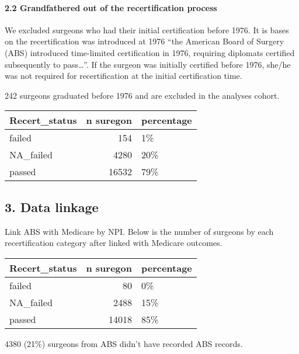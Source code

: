 \documentclass[
]{article}
\begin{document}
\hypertarget{grandfathered-out-of-the-recertification-process}{%
\paragraph{2.2 Grandfathered out of the recertification
process}\label{grandfathered-out-of-the-recertification-process}}

We excluded surgeons who had their initial certification before 1976. It
is bases on the recertification was introduced at 1976 ``the American
Board of Surgery (ABS) introduced time-limited certification in 1976,
requiring diplomats certified subsequently to pass\ldots{}''. If the
surgeon was initially certified before 1976, she/he was not required for
recertification at the initial certification time.

242 surgeons graduated before 1976 and are excluded in the analyses
cohort.

\begin{table}[H]
\centering
\begin{tabular}{l|r|l}
\hline
Recert\_status & n suregon & percentage\\
\hline
failed & 154 & 1\%\\
\hline
NA\_failed & 4280 & 20\%\\
\hline
passed & 16532 & 79\%\\
\hline
\end{tabular}
\end{table}

\hypertarget{data-linkage}{%
\subsection{3. Data linkage}\label{data-linkage}}

Link ABS with Medicare by NPI. Below is the number of surgeons by each
recertification category after linked with Medicare outcomes.

\begin{table}[H]
\centering
\begin{tabular}{l|r|l}
\hline
Recert\_status & n suregon & percentage\\
\hline
failed & 80 & 0\%\\
\hline
NA\_failed & 2488 & 15\%\\
\hline
passed & 14018 & 85\%\\
\hline
\end{tabular}
\end{table}

4380 (21\%) surgeons from ABS didn't have recorded ABS records.
\end{document}
